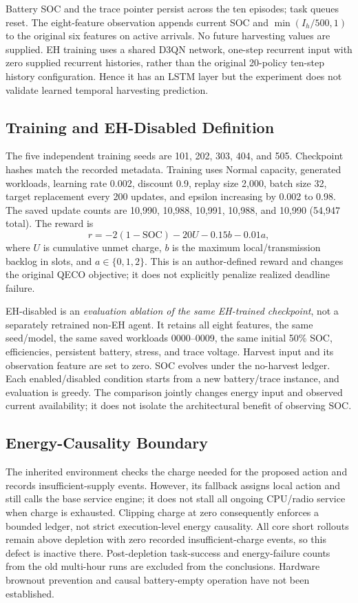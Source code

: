 \documentclass[conference]{IEEEtran}
\begin{document}
Battery SOC and the trace pointer persist across the ten episodes; task queues reset. The eight-feature observation appends current SOC and $\min(I_h/500,1)$ to the original six features on active arrivals. No future harvesting values are supplied. EH training uses a shared D3QN network, one-step recurrent input with zero supplied recurrent histories, rather than the original 20-policy ten-step history configuration. Hence it has an LSTM layer but the experiment does not validate learned temporal harvesting prediction.

\subsection{Training and EH-Disabled Definition}
The five independent training seeds are 101, 202, 303, 404, and 505. Checkpoint hashes match the recorded metadata. Training uses Normal capacity, generated workloads, learning rate 0.002, discount 0.9, replay size 2,000, batch size 32, target replacement every 200 updates, and epsilon increasing by 0.002 to 0.98. The saved update counts are 10,990, 10,988, 10,991, 10,988, and 10,990 (54,947 total). The reward is
\begin{equation}
r=-2(1-\mathrm{SOC})-20U-0.15b-0.01a,
\label{eq:reward}
\end{equation}
where $U$ is cumulative unmet charge, $b$ is the maximum local/transmission backlog in slots, and $a\in\{0,1,2\}$. This is an author-defined reward and changes the original QECO objective; it does not explicitly penalize realized deadline failure.

EH-disabled is an \emph{evaluation ablation of the same EH-trained checkpoint}, not a separately retrained non-EH agent. It retains all eight features, the same seed/model, the same saved workloads 0000--0009, the same initial 50\% SOC, efficiencies, persistent battery, stress, and trace voltage. Harvest input and its observation feature are set to zero. SOC evolves under the no-harvest ledger. Each enabled/disabled condition starts from a new battery/trace instance, and evaluation is greedy. The comparison jointly changes energy input and observed current availability; it does not isolate the architectural benefit of observing SOC.

\subsection{Energy-Causality Boundary}
The inherited environment checks the charge needed for the proposed action and records insufficient-supply events. However, its fallback assigns local action and still calls the base service engine; it does not stall all ongoing CPU/radio service when charge is exhausted. Clipping charge at zero consequently enforces a bounded ledger, not strict execution-level energy causality. All core short rollouts remain above depletion with zero recorded insufficient-charge events, so this defect is inactive there. Post-depletion task-success and energy-failure counts from the old multi-hour runs are excluded from the conclusions. Hardware brownout prevention and causal battery-empty operation have not been established.
\end{document}
